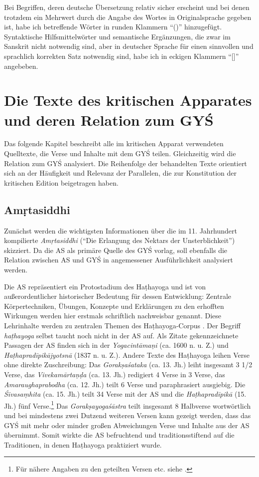 \documentclass[a4paper,12pt]{article}
\begin{document}
{   Bei Begriffen, deren deutsche Übersetzung relativ sicher erscheint und bei denen trotzdem ein Mehrwert durch die Angabe des Wortes in Originalsprache gegeben ist, habe ich betreffende Wörter in runden Klammern ``()'' hinzugefügt. Syntaktische Hilfsmittelwörter und semantische Ergänzungen, die zwar im Sanskrit nicht notwendig sind, aber in deutscher Sprache für einen sinnvollen und sprachlich korrekten Satz notwendig sind, habe ich in eckigen Klammern ``[]'' angebeben.

\section{Die Texte des kritischen Apparates und deren Relation zum GYŚ}

Das folgende Kapitel beschreibt alle im kritischen Apparat verwendeten Quelltexte, die Verse und Inhalte mit dem GYŚ teilen. Gleichzeitig wird die Relation zum GYŚ analysiert. Die Reihenfolge der behandelten Texte orientiert sich an der Häufigkeit und Relevanz der Parallelen, die zur Konstitution der kritischen Edition beigetragen haben.  

\subsection{Amṛtasiddhi}
\label{asref}

Zunächst werden die wichtigsten Informationen über die im 11. Jahrhundert kompilierte \textit{Amṛtasiddhi} (``Die Erlangung des Nektars der Unsterblichkeit'') skizziert. Da die AS als primäre Quelle des GYŚ vorlag, soll ebenfalls die Relation zwischen AS und GYŚ in angemessener Ausführlichkeit analysiert werden.

Die AS repräsentiert ein Protostadium des Haṭhayoga und ist von außerordentlicher historischer Bedeutung für dessen Entwicklung: Zentrale Körpertechniken, Übungen, Konzepte und Erklärungen zu den erhofften Wirkungen werden hier erstmals schriftlich nachweisbar genannt. Diese Lehrinhalte werden zu zentralen Themen des Haṭhayoga-Corpus \parencite[4]{mallinson2016as}. Der Begriff \textit{haṭhayoga} selbst taucht noch nicht in der AS auf. Als Zitate gekennzeichnete Passagen der AS finden sich in der \textit{Yogacintāmaṇi} (ca. 1600 n. u. Z.) und \textit{Haṭhapradīpikājyotsnā} (1837 n. u. Z.). Andere Texte des Haṭhayoga leihen Verse ohne direkte Zuschreibung: Das \textit{Gorakṣaśataka} (ca. 13. Jh.) leiht insgesamt 3 1/2 Verse, das \textit{Vivekamārtaṇḍa} (ca. 13. Jh.) redigiert 4 Verse in 3 Verse, das \textit{Amaraughaprabodha} (ca. 12. Jh.) teilt 6 Verse und paraphrasiert ausgiebig. Die \textit{Śivasaṃhita} (ca. 15. Jh.) teilt 34 Verse mit der AS und die \textit{Haṭhapradīpikā} (15. Jh.) fünf Verse.\footnote{Für nähere Angaben zu den geteilten Versen etc. siehe \parencite[3]{mallinson2016as}.} Das \textit{Gorakṣayogaśāstra} teilt insgesamt 8 Halbverse wortwörtlich und bei mindestens zwei Dutzend weiteren Versen kann gezeigt werden, dass das GYŚ mit mehr oder minder großen Abweichungen Verse und Inhalte aus der AS übernimmt. Somit wirkte die AS befruchtend und traditionsstiftend auf die Traditionen, in denen Haṭhayoga praktiziert wurde. 

}
\end{document}
